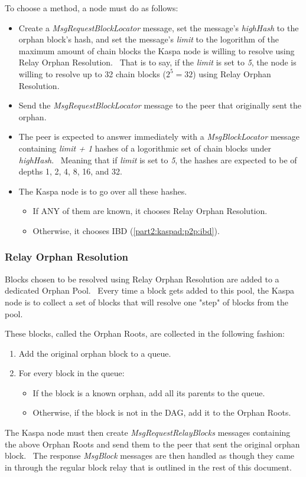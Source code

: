 To choose a method, a node must do as follows:
\begin{itemize}
    \item Create a \textit{MsgRequestBlockLocator} message, set the message's \textit{highHash} to the orphan block's hash, and set the message's \textit{limit} to the logorithm of the maximum amount of chain blocks the Kaspa node is willing to resolve using Relay Orphan Resolution. \
    That is to say, if the \textit{limit} is set to \textit{5}, the node is willing to resolve up to 32 chain blocks ($2^5 = 32$) using Relay Orphan Resolution.
    \item Send the \textit{MsgRequestBlockLocator} message to the peer that originally sent the orphan.
    \item The peer is expected to answer immediately with a \textit{MsgBlockLocator} message containing     \textit{limit + 1} hashes of a logorithmic set of chain blocks under \textit{highHash}. \
Meaning that if \textit{limit} is set to \textit{5}, the hashes are expected to be of depths 1, 2, 4, 8, 16, and 32.
    \item The Kaspa node is to go over all these hashes.
    \begin{itemize}
        \item If ANY of them are known, it chooses Relay Orphan Resolution.
        \item Otherwise, it chooses IBD (\cref{part2:kaspad:p2p:ibd}).
    \end{itemize}
\end{itemize}


\subsubsection{Relay Orphan Resolution}

Blocks chosen to be resolved using Relay Orphan Resolution are added to a dedicated Orphan Pool. \
Every time a block gets added to this pool, the Kaspa node is to collect a set of blocks that will resolve one "step" of blocks from the pool.

These blocks, called the Orphan Roots, are collected in the following fashion:
\begin{enumerate}
    \item Add the original orphan block to a queue.
    \item For every block in the queue:
    \begin{itemize}
        \item If the block is a known orphan, add all its parents to the queue.
        \item Otherwise, if the block is not in the DAG, add it to the Orphan Roots.
    \end{itemize}
\end{enumerate}


The Kaspa node must then create \textit{MsgRequestRelayBlocks} messages containing the above Orphan Roots and send them to the peer that sent the original orphan block. \
The response \textit{MsgBlock} messages are then handled as though they came in through the regular block relay that is outlined in the rest of this document.